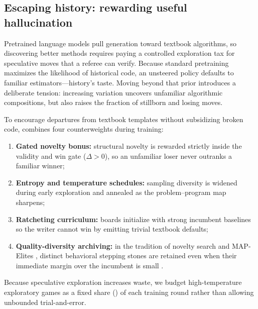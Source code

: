 \subsection{Escaping history: rewarding useful hallucination}\label{sub:price-hallucination}\label{subsec:useful-hallucination}

Pretrained language models pull generation toward textbook algorithms, so discovering better methods requires paying a controlled exploration tax for speculative moves that a referee can verify. Because standard pretraining maximizes the likelihood of historical code, an unsteered policy defaults to familiar estimators---history's taste. Moving beyond that prior introduces a deliberate tension: increasing variation uncovers unfamiliar algorithmic compositions, but also raises the fraction of stillborn and losing moves.

To encourage departures from textbook templates without subsidizing broken code, \EZ{} combines four counterweights during training:
\begin{enumerate}
  \item \textbf{Gated novelty bonus:} structural novelty is rewarded strictly inside the validity and win gate ($\Delta > 0$), so an unfamiliar loser never outranks a familiar winner;
  \item \textbf{Entropy and temperature schedules:} sampling diversity is widened during early exploration and annealed as the problem--program map sharpens;
  \item \textbf{Ratcheting curriculum:} boards initialize with strong incumbent baselines so the writer cannot win by emitting trivial textbook defaults;
  \item \textbf{Quality-diversity archiving:} in the tradition of novelty search \citep{lehman2011novelty} and MAP-Elites \citep{mouret2015mapelites}, distinct behavioral stepping stones are retained even when their immediate margin over the incumbent is small \citep{stanley2015greatness}.
\end{enumerate}
Because speculative exploration increases waste, we budget high-temperature exploratory games as a fixed share () of each training round rather than allowing unbounded trial-and-error.

